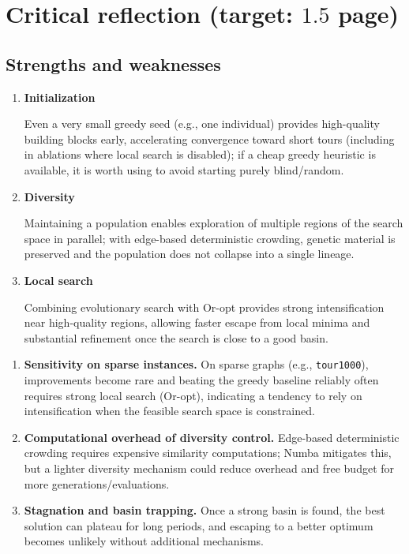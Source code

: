 \documentclass[a4paper,10pt]{article}
\begin{document}
\section{Critical reflection \hfill(target: $1.5$ page)}

\subsection{Strengths and weaknesses}

\begin{enumerate}
  \item \textbf{Initialization}

  Even a very small greedy seed (e.g., one individual) provides high-quality building blocks early, accelerating convergence toward short tours (including in ablations where local search is disabled); if a cheap greedy heuristic is available, it is worth using to avoid starting purely blind/random.

  \item \textbf{Diversity}

  Maintaining a population enables exploration of multiple regions of the search space in parallel; with edge-based deterministic crowding, genetic material is preserved and the population does not collapse into a single lineage.

  \item \textbf{Local search}

  Combining evolutionary search with Or-opt provides strong intensification near high-quality regions, allowing faster escape from local minima and substantial refinement once the search is close to a good basin.

\end{enumerate}

\begin{enumerate}
  \item \textbf{Sensitivity on sparse instances.}
  On sparse graphs (e.g., \texttt{tour1000}), improvements become rare and beating the greedy baseline reliably often requires strong local search (Or-opt), indicating a tendency to rely on intensification when the feasible search space is constrained.

  \item \textbf{Computational overhead of diversity control.}
  Edge-based deterministic crowding requires expensive similarity computations; Numba mitigates this, but a lighter diversity mechanism could reduce overhead and free budget for more generations/evaluations.

  \item \textbf{Stagnation and basin trapping.}
  Once a strong basin is found, the best solution can plateau for long periods, and escaping to a better optimum becomes unlikely without additional mechanisms.
\end{enumerate}
\end{document}
